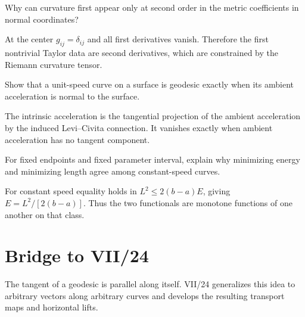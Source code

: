 \begin{problem}\label{prob:vii23-ch03}
Why can curvature first appear only at second order in the metric coefficients in normal coordinates?
\end{problem}
\begin{solution}
At the center \(g_{ij}=\delta_{ij}\) and all first derivatives vanish. Therefore the first nontrivial Taylor data are second derivatives, which are constrained by the Riemann curvature tensor.
\end{solution}


\begin{problem}\label{prob:vii23-ch04}
Show that a unit-speed curve on a surface is geodesic exactly when its ambient acceleration is normal to the surface.
\end{problem}
\begin{solution}
The intrinsic acceleration is the tangential projection of the ambient acceleration by the induced Levi--Civita connection. It vanishes exactly when ambient acceleration has no tangent component.
\end{solution}


\begin{problem}\label{prob:vii23-ch05}
For fixed endpoints and fixed parameter interval, explain why minimizing energy and minimizing length agree among constant-speed curves.
\end{problem}
\begin{solution}
For constant speed equality holds in \(L^2\le2(b-a)E\), giving \(E=L^2/[2(b-a)]\). Thus the two functionals are monotone functions of one another on that class.
\end{solution}

\section*{Bridge to VII/24}
The tangent of a geodesic is parallel along itself. VII/24 generalizes this idea to arbitrary vectors along arbitrary curves and develops the resulting transport maps and horizontal lifts.
